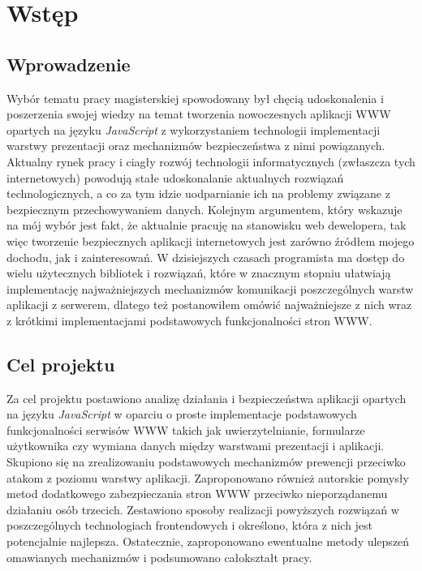 
\chapter{Wstęp}

\section{Wprowadzenie}
Wybór tematu pracy magisterskiej spowodowany był chęcią udoskonalenia i poszerzenia swojej wiedzy na temat tworzenia nowoczesnych aplikacji WWW opartych na języku \textit{JavaScript} z wykorzystaniem technologii implementacji warstwy prezentacji oraz mechanizmów bezpieczeństwa z nimi powiązanych. Aktualny rynek pracy i ciagły rozwój technologii informatycznych (zwłaszcza tych internetowych) powodują stałe udoskonalanie aktualnych rozwiązań technologicznych, a co za tym idzie uodparnianie ich na problemy związane z bezpiecznym przechowywaniem danych. Kolejnym argumentem, który wskazuje na mój wybór jest fakt, że aktualnie pracuję na stanowisku web dewelopera, tak więc tworzenie bezpiecznych aplikacji internetowych jest zarówno źródłem mojego dochodu, jak i zainteresowań. W dzisiejszych czasach programista ma dostęp do wielu użytecznych bibliotek i rozwiązań, które w znacznym stopniu ułatwiają implementację najważniejszych mechanizmów komunikacji poszczególnych warstw aplikacji z serwerem, dlatego też postanowiłem omówić najważniejsze z nich wraz z krótkimi implementacjami podstawowych funkcjonalności stron WWW. 

 

\noindent

\section{Cel projektu}
Za cel projektu postawiono analizę działania i bezpieczeństwa aplikacji opartych na języku \textit{JavaScript} w oparciu o proste implementacje podstawowych funkcjonalności serwisów WWW takich jak uwierzytelnianie, formularze użytkownika czy wymiana danych między warstwami prezentacji i aplikacji. Skupiono się na zrealizowaniu podstawowych mechanizmów prewencji przeciwko atakom z poziomu warstwy aplikacji. Zaproponowano również autorskie pomysły metod dodatkowego zabezpieczania stron WWW przeciwko nieporządanemu działaniu osób trzecich. Zestawiono sposoby realizacji powyższych rozwiązań w poszczególnych technologiach frontendowych i określono, która z nich jest potencjalnie najlepsza. Ostatecznie, zaproponowano ewentualne metody ulepszeń omawianych mechanizmów i podsumowano całokształt pracy.

